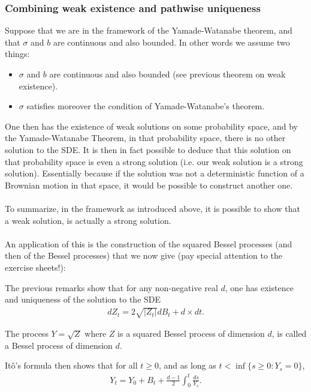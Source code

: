 \documentclass[../mainfile.tex]{subfiles}
\begin{document}
\subsubsection{Combining weak existence and pathwise uniqueness}
Suppose that we are in the framework of the Yamade-Watanabe theorem, and that $\sigma$ and $b$ are continuous and also bounded. In other words we assume two things:
\begin{itemize}
\item $\sigma$ and $b$ are continuous and also bounded (see previous theorem on weak existence).
\item $\sigma$ satisfies moreover the condition of Yamade-Watanabe's theorem. 
\end{itemize}
One then has the existence of weak solutions on some probability space, and by the Yamade-Watanabe Theorem, in that probability space, there is no other solution to the SDE. It is then in fact possible to deduce that this solution on that probability space is even a strong solution (i.e. our weak solution is a strong solution). Essentially because if the solution was not a deterministic function of a Brownian motion in that space, it would be possible to construct another one. 
\\
\\
To summarize, in the framework as introduced above, it is possible to show that a weak solution, is actually a strong solution. 
\\\\
An application of this is the construction of the squared Bessel processes (and then of the Bessel processes) that we now give (pay special attention to the exercise sheets!):
\begin{cor} The previous remarks show that for any non-negative real $d$, one has existence and uniqueness of the solution to the SDE
\begin{align*}
dZ_t= 2 \sqrt{|Z_t|} dB_t + d \times dt.
\end{align*}
\end{cor}
\begin{defn}The process $Y= \sqrt{Z}$ where $Z$ is a squared Bessel process of dimension $d$, is called a Bessel process of dimension $d$.
\end{defn}
Itô's formula then shows that for all $t \geq 0$, and as long as $t <\inf \{s \geq 0: Y_s=0\}$,
\begin{align*}
Y_t = Y_0 + B_t + \frac{d-1}{2} \int_0^t \frac{ds}{Y_s}.
\end{align*}
\end{document}
